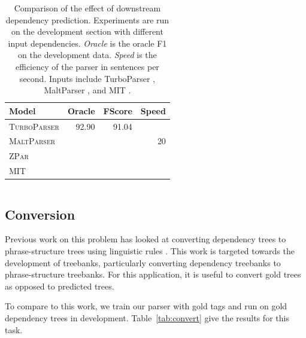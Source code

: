 \documentclass[11pt,letterpaper]{article}
\begin{document}
\begin{table}
  \centering
  \small

  \begin{tabular}{|l|rrr|}
    \hline
    Model & Oracle & FScore & Speed  \\
    \hline

    \hline
    \textsc{TurboParser} & 92.90 & 91.04 & \\
    \textsc{MaltParser}  & & & 20 \\
    \textsc{ZPar}        & & & \\
    \textsc{MIT}         & & & \\
    \hline
  \end{tabular}

  \vspace{0.5cm}

  \label{tab:oracle}
  \caption{Comparison of the effect of downstream dependency prediction.
    Experiments are run on the development section with different input dependencies. \textit{Oracle} is the oracle F1 on the development data. \textit{Speed} is the efficiency of the parser in sentences per second.
    Inputs include TurboParser \cite{martins2013turning}, MaltParser \cite{nivre2006maltparser}, and MIT \cite{}. }
\end{table}



\begin{table}
  \centering
  \begin{tabular}{ll}
    
  \end{tabular}
\end{table}

\subsection{Conversion}

Previous work on this problem has looked at converting dependency trees to phrase-structure trees using linguistic rules \cite{xia2001converting,xia2009towards}. This work is targeted towards the development of treebanks, particularly converting dependency treebanks to phrase-structure treebanks.
For this application, it is useful to convert gold trees as opposed to predicted trees.

To compare to this work, we train our parser with gold tags and run on gold dependency trees in development. Table~\ref{tab:convert} give the results for this task.
\end{document}
